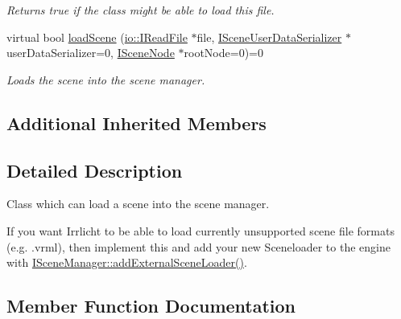 \begin{DoxyCompactItemize}
\begin{DoxyCompactList}\small\item\em Returns true if the class might be able to load this file. \end{DoxyCompactList}\item 
virtual bool \hyperlink{classirr_1_1scene_1_1ISceneLoader_a55282c77040a78c2b172d77bbcff8ae8}{load\+Scene} (\hyperlink{classirr_1_1io_1_1IReadFile}{io\+::\+I\+Read\+File} $\ast$file, \hyperlink{classirr_1_1scene_1_1ISceneUserDataSerializer}{I\+Scene\+User\+Data\+Serializer} $\ast$user\+Data\+Serializer=0, \hyperlink{classirr_1_1scene_1_1ISceneNode}{I\+Scene\+Node} $\ast$root\+Node=0)=0
\begin{DoxyCompactList}\small\item\em Loads the scene into the scene manager. \end{DoxyCompactList}\end{DoxyCompactItemize}
\subsection*{Additional Inherited Members}


\subsection{Detailed Description}
Class which can load a scene into the scene manager. 

If you want Irrlicht to be able to load currently unsupported scene file formats (e.\+g. .vrml), then implement this and add your new Sceneloader to the engine with \hyperlink{classirr_1_1scene_1_1ISceneManager_a8f0bc0221c4faaca80ac8f560ee424ef}{I\+Scene\+Manager\+::add\+External\+Scene\+Loader()}. 

\subsection{Member Function Documentation}
\mbox{\label{classirr_1_1scene_1_1ISceneLoader_a55b0367762135b84a077ef75ca942594}} 
